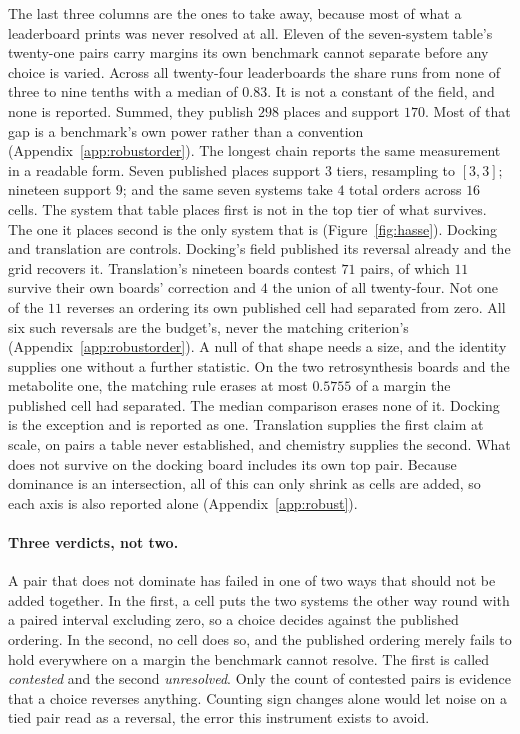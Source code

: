 \documentclass{article}
\begin{document}
The last three columns are the ones to take away, because most of what a leaderboard prints was
never resolved at all. Eleven of the seven-system table's twenty-one pairs carry margins its own
benchmark cannot separate before any choice is varied. Across all twenty-four leaderboards the
share runs from none of three to nine tenths with a median of $0.83$. It is not a constant of the
field, and none is reported. Summed, they publish $298$ places and support $170$. Most of that gap
is a benchmark's own power rather than a convention (Appendix~\ref{app:robustorder}). The longest
chain reports the same measurement in a readable form. Seven published places support $3$ tiers,
resampling to $[3,3]$; nineteen support $9$; and the same seven systems take $4$ total orders across
$16$ cells. The system that table places first is not in the top tier of what survives. The one it
places second is the only system that is (Figure~\ref{fig:hasse}). Docking and translation are
controls. Docking's field published its reversal already \citep{Buttenschoen_2024} and the grid
recovers it. Translation's nineteen boards contest $71$ pairs, of which $11$ survive their own
boards' correction and $4$ the union of all twenty-four. Not one of the $11$ reverses an ordering
its own published cell had separated from zero. All six such reversals are the budget's, never the
matching criterion's (Appendix~\ref{app:robustorder}). A null of that shape needs a size, and the
identity supplies one without a further statistic. On the two retrosynthesis boards and the
metabolite one, the matching rule erases at most $0.5755$ of a margin the published cell had
separated. The median comparison erases none of it. Docking is the exception and is reported as
one. Translation supplies the first claim at scale, on pairs a table never established, and
chemistry supplies the second. What does not survive on the docking board includes its own top pair.
Because dominance is an intersection, all of this can only shrink as cells are added, so each axis
is also reported alone (Appendix~\ref{app:robust}).

\paragraph{Three verdicts, not two.} A pair that does not dominate has failed in one of two ways
that should not be added together. In the first, a cell puts the two systems the other way
round with a paired interval excluding zero, so a choice decides against the published ordering. In
the second, no cell does so, and the published ordering merely fails to hold everywhere on a margin
the benchmark cannot resolve. The first is called \emph{contested} and the second
\emph{unresolved}. Only the count of contested pairs is evidence that a choice reverses anything.
Counting sign changes alone would let noise on a tied pair read as a reversal, the error this
instrument exists to avoid.
\end{document}
